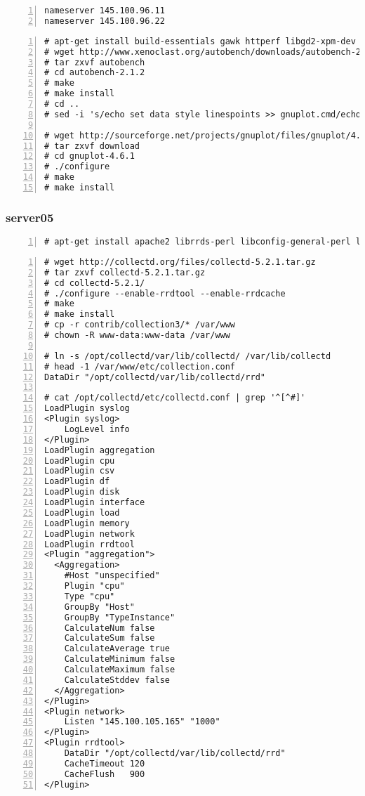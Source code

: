 \documentclass[Configuration]{subfiles}
\begin{document}
\begin{lstlisting}[frame=single,caption=/etc/resolv.conf,backgroundcolor=\color{gray},breaklines=true,numbers=left,]
nameserver 145.100.96.11
nameserver 145.100.96.22
\end{lstlisting}

\begin{lstlisting}[frame=single,caption=httperf and autobench,backgroundcolor=\color{gray},breaklines=true,numbers=left,]
# apt-get install build-essentials gawk httperf libgd2-xpm-dev
# wget http://www.xenoclast.org/autobench/downloads/autobench-2.1.2.tar.gz
# tar zxvf autobench
# cd autobench-2.1.2
# make
# make install
# cd ..
# sed -i 's/echo set data style linespoints >> gnuplot.cmd/echo set style data linespoints >> gnuplot.cmd/' /usr/local/bin/bench2graph

# wget http://sourceforge.net/projects/gnuplot/files/gnuplot/4.6.1/gnuplot-4.6.1.tar.gz/download
# tar zxvf download
# cd gnuplot-4.6.1
# ./configure
# make
# make install
\end{lstlisting}

\subsubsection{server05}

\begin{lstlisting}[frame=single,caption=Debian packages,backgroundcolor=\color{gray},breaklines=true,numbers=left,]
# apt-get install apache2 librrds-perl libconfig-general-perl libhtml-parser-perl libregexp-common-perl librrd2-dev rrdtool
\end{lstlisting}

\begin{lstlisting}[frame=single,caption=Collectd,backgroundcolor=\color{gray},breaklines=true,numbers=left,]
# wget http://collectd.org/files/collectd-5.2.1.tar.gz
# tar zxvf collectd-5.2.1.tar.gz
# cd collectd-5.2.1/
# ./configure --enable-rrdtool --enable-rrdcache
# make
# make install
# cp -r contrib/collection3/* /var/www
# chown -R www-data:www-data /var/www

# ln -s /opt/collectd/var/lib/collectd/ /var/lib/collectd
# head -1 /var/www/etc/collection.conf 
DataDir "/opt/collectd/var/lib/collectd/rrd"

# cat /opt/collectd/etc/collectd.conf | grep '^[^#]'
LoadPlugin syslog
<Plugin syslog>
    LogLevel info
</Plugin>
LoadPlugin aggregation
LoadPlugin cpu
LoadPlugin csv
LoadPlugin df
LoadPlugin disk
LoadPlugin interface
LoadPlugin load
LoadPlugin memory
LoadPlugin network
LoadPlugin rrdtool
<Plugin "aggregation">
  <Aggregation>
    #Host "unspecified"
    Plugin "cpu"
    Type "cpu"
    GroupBy "Host"
    GroupBy "TypeInstance"
    CalculateNum false
    CalculateSum false
    CalculateAverage true
    CalculateMinimum false
    CalculateMaximum false
    CalculateStddev false
  </Aggregation>
</Plugin>
<Plugin network>
    Listen "145.100.105.165" "1000"
</Plugin>
<Plugin rrdtool>
    DataDir "/opt/collectd/var/lib/collectd/rrd"
    CacheTimeout 120
    CacheFlush   900
</Plugin>
\end{lstlisting}
\end{document}
